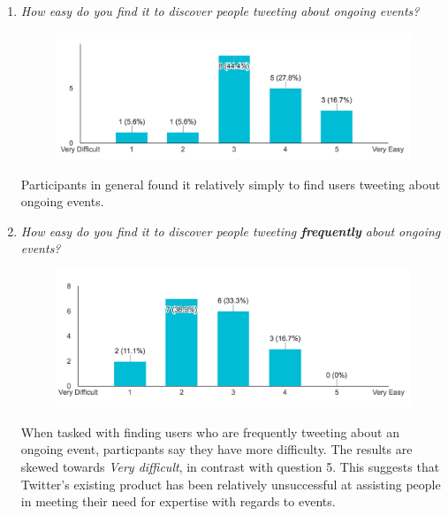 \documentclass{l4proj}
\begin{document}
\begin{enumerate}
\item \textit{How easy do you find it to discover people tweeting about ongoing events?}
\par
\begin{figure}[H]
\centering
\includegraphics[scale=0.7]{findingusers.png}
\label{findingusers}
\end{figure}
Participants in general found it relatively simply to find users tweeting about ongoing events.


\item \textit{How easy do you find it to discover people tweeting \textbf{frequently} about ongoing events?}
\par
\begin{figure}[H]
\centering
\includegraphics[scale=0.7]{findingusersfreq.png}
\label{findingusersfreq}
\end{figure}
When tasked with finding users who are frequently tweeting about an ongoing event, particpants say they have more difficulty. The results are skewed towards \textit{Very difficult}, in contrast with question 5. This suggests that Twitter's existing product has been relatively unsuccessful  at assisting people in meeting their need for expertise with regards to events.


\end{enumerate}
\end{document}
